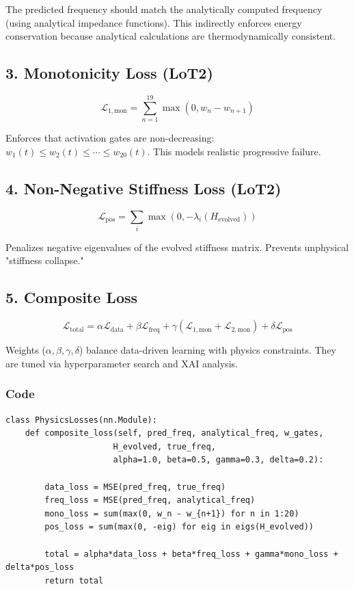 \documentclass[11pt,a4paper]{article}
\begin{document}
The predicted frequency should match the analytically computed frequency (using analytical impedance functions). This indirectly enforces energy conservation because analytical calculations are thermodynamically consistent.

\subsection{3. Monotonicity Loss (LoT2)}

\begin{equation}
\mathcal{L}_{1,\text{mon}} = \sum_{n=1}^{19} \max(0, w_n - w_{n+1})
\end{equation}

Enforces that activation gates are non-decreasing: $w_1(t) \leq w_2(t) \leq \cdots \leq w_{20}(t)$. This models realistic progressive failure.

\subsection{4. Non-Negative Stiffness Loss (LoT2)}

\begin{equation}
\mathcal{L}_{\text{pos}} = \sum_{i} \max(0, -\lambda_i(H_{\text{evolved}}))
\end{equation}

Penalizes negative eigenvalues of the evolved stiffness matrix. Prevents unphysical "stiffness collapse."

\subsection{5. Composite Loss}

\begin{equation}
\mathcal{L}_{\text{total}} = \alpha \mathcal{L}_{\text{data}} + \beta \mathcal{L}_{\text{freq}} + \gamma (\mathcal{L}_{1,\text{mon}} + \mathcal{L}_{2,\text{mon}}) + \delta \mathcal{L}_{\text{pos}}
\end{equation}

Weights ($\alpha, \beta, \gamma, \delta$) balance data-driven learning with physics constraints. They are tuned via hyperparameter search and XAI analysis.

\subsubsection{Code}

\begin{lstlisting}
class PhysicsLosses(nn.Module):
    def composite_loss(self, pred_freq, analytical_freq, w_gates,
                      H_evolved, true_freq,
                      alpha=1.0, beta=0.5, gamma=0.3, delta=0.2):

        data_loss = MSE(pred_freq, true_freq)
        freq_loss = MSE(pred_freq, analytical_freq)
        mono_loss = sum(max(0, w_n - w_{n+1}) for n in 1:20)
        pos_loss = sum(max(0, -eig) for eig in eigs(H_evolved))

        total = alpha*data_loss + beta*freq_loss + gamma*mono_loss + delta*pos_loss
        return total
\end{lstlisting}
\end{document}
